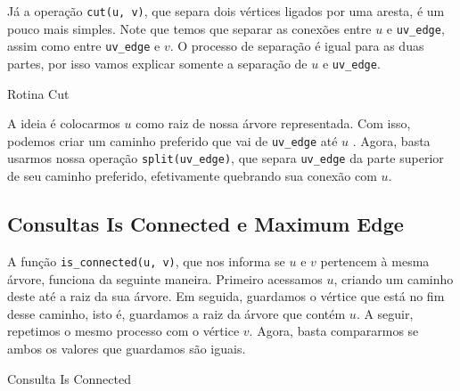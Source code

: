 Já a operação \texttt{cut(u, v)}, que separa dois vértices ligados por uma aresta, é um pouco mais simples. Note que temos que separar as conexões entre $u$ e \texttt{uv\_edge}, assim como entre \texttt{uv\_edge} e $v$. O processo de separação é igual para as duas partes, por isso vamos explicar somente a separação de $u$ e \texttt{uv\_edge}.

\begin{algorithm}[h!]
    \caption{Rotina Cut}\label{lct:cut}
    \begin{algorithmic}[1]
        \State {}
        \State {}
        \EndFunction
    \end{algorithmic}
\end{algorithm}

A ideia é colocarmos $u$ como raiz de nossa árvore representada. Com isso, podemos criar um caminho preferido que vai de \texttt{uv\_edge} até $u$ . Agora, basta usarmos nossa operação \texttt{split(uv\_edge)}, que separa \texttt{uv\_edge} da parte superior de seu caminho preferido, efetivamente quebrando sua conexão com $u$.

\subsection{Consultas Is Connected e Maximum Edge}
\label{subsection:lct-is-connected}

A função \texttt{is\_connected(u, v)}, que nos informa se $u$ e $v$ pertencem à mesma árvore, funciona da seguinte maneira. Primeiro acessamos $u$, criando um caminho deste até a raiz da sua árvore. Em seguida, guardamos o vértice que está no fim desse caminho, isto é, guardamos a raiz da árvore que contém $u$. A seguir, repetimos o mesmo processo com o vértice $v$. Agora, basta compararmos se ambos os valores que guardamos são iguais.

\begin{algorithm}[h!]
    \caption{Consulta Is Connected}\label{lct:is-connected}
    \begin{algorithmic}[1]
        \State {}
        \EndFunction
    \end{algorithmic}
\end{algorithm}

